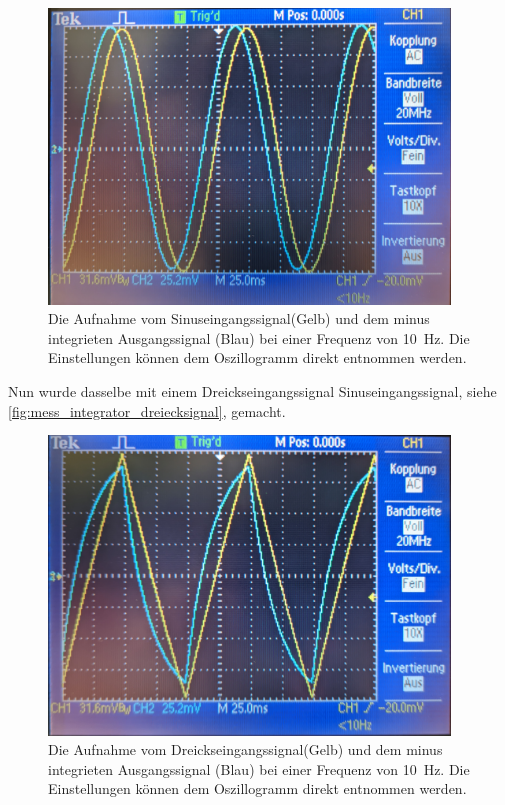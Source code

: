 \documentclass[12pt,english,ngerman]{scrartcl}
\begin{document}
\begin{figure}[H]
  \centering
    \includegraphics[width=0.95\textwidth]{./figures/integrator/sinussignal.jpg}
  \caption{Die Aufnahme vom Sinuseingangssignal(Gelb) und dem minus integrieten
  Ausgangssignal (Blau) bei einer Frequenz von \SI{10}{\hertz}. Die
  Einstellungen können dem Oszillogramm direkt entnommen werden.}
  \label{fig:mess_integrator_sinussignal}
\end{figure}

Nun wurde dasselbe mit einem Dreickseingangssignal
Sinuseingangssignal, siehe \autoref{fig:mess_integrator_dreiecksignal}, gemacht.

\begin{figure}[H]
  \centering
    \includegraphics[width=0.95\textwidth]{./figures/integrator/dreiecksignal.jpg}
  \caption{Die Aufnahme vom Dreickseingangssignal(Gelb) und dem minus integrieten
  Ausgangssignal (Blau) bei einer Frequenz von \SI{10}{\hertz}. Die
  Einstellungen können dem Oszillogramm direkt entnommen werden.}
  \label{fig:mess_integrator_dreiecksignal}
\end{figure}
\end{document}
